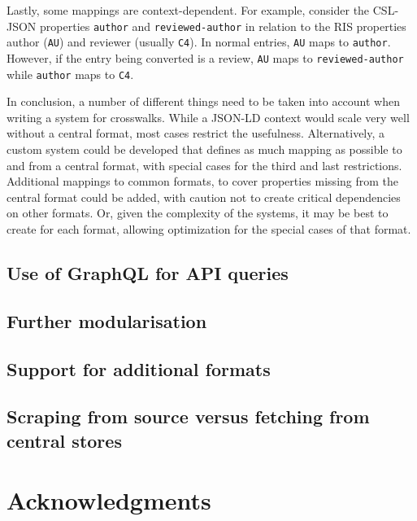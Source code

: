 \documentclass[fleqn,10pt,lineno]{wlpeerj} %
\begin{document}
Lastly, some mappings are context-dependent. For example, consider the CSL-JSON properties \texttt{author} and \texttt{reviewed-author} in relation to the RIS properties author (\texttt{AU}) and reviewer (usually \texttt{C4}). In normal entries, \texttt{AU} maps to \texttt{author}. However, if the entry being converted is a review, \texttt{AU} maps to \texttt{reviewed-author} while \texttt{author} maps to \texttt{C4}.

In conclusion, a number of different things need to be taken into account when writing a system for crosswalks. While a JSON-LD context would scale very well without a central format, most cases restrict the usefulness. Alternatively, a custom system could be developed that defines as much mapping as possible to and from a central format, with special cases for the third and last restrictions. Additional mappings to common formats, to cover properties missing from the central format could be added, with caution not to create critical dependencies on other formats. Or, given the complexity of the systems, it may be best to create for each format, allowing optimization for the special cases of that format.

\subsection*{Use of GraphQL for API queries}

\subsection*{Further modularisation}

\subsection*{Support for additional formats}

\subsection*{Scraping from source versus fetching from central stores}

\section*{Acknowledgments}



\end{document}
